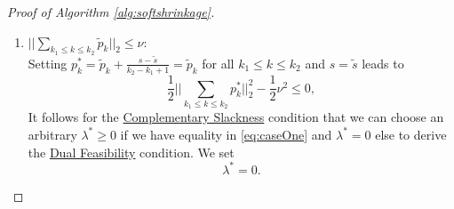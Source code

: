 \begin{proof}[Proof of Algorithm \ref{alg:softshrinkage}]
        \begin{enumerate}
            \item $||\sum\limits_{k_{1} \le k \le k_{2}} \tilde{p}_{k}||_{2} \le \nu$:\\
            Setting $p^{\ast}_{k} = \tilde{p}_{k} + \frac{s - \tilde{s}}{k_{2} - k_{1} + 1} = \tilde{p}_{k}$ for all $k_{1} \le k \le k_{2}$ and $s = \tilde{s}$ leads to
                \begin{equation}
                    \frac{1}{2} ||\sum_{k_{1} \le k \le k_{2}} p^{\ast}_{k}||_{2}^{2} - \frac{1}{2} \nu^{2} \le 0, \label{eq:caseOne}
                \end{equation}
            It follows for the \underline{Complementary Slackness} condition that we can choose an arbitrary $\lambda^{\ast} \ge 0$ if we have equality in \ref{eq:caseOne} and $\lambda^{\ast} = 0$ else to derive the \underline{Dual Feasibility} condition. We set
                $$\lambda^{\ast} = 0.$$


\end{enumerate}
\end{proof}
